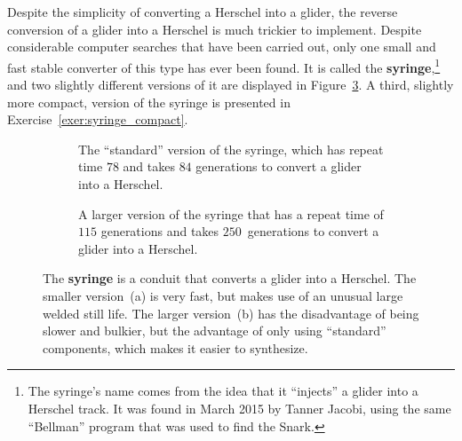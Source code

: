 Despite the simplicity of converting a Herschel into a glider, the reverse conversion of a glider into a Herschel is much trickier to implement. Despite considerable computer searches that have been carried out, only one small and fast stable converter of this type has ever been found. It is called the \textbf{syringe},\footnote{The syringe's name comes from the idea that it ``injects'' a glider into a Herschel track. It was found in March 2015 by Tanner Jacobi, using the same ``Bellman'' program that was used to find the Snark.} and two slightly different versions of it are displayed in Figure~\ref{fig:syringe}. A third, slightly more compact, version of the syringe is presented in Exercise~\ref{exer:syringe_compact}.

\begin{figure}[!htb]
	\centering
	\begin{subfigure}{.33\textwidth}
		\centering{}
		\caption{The ``standard'' version of the syringe, which has repeat time $78$ and takes $84$ generations to convert a glider into a Herschel.}\label{fig:syringe_main}
	\end{subfigure} \hfill %
	\begin{subfigure}{.635\textwidth}
		\centering{}
		\caption{A larger version of the syringe that has a repeat time of $115$ generations and takes $250$~generations to convert a glider into a Herschel.}
		\label{fig:syringe_modified}
	\end{subfigure}
	\caption{The \textbf{syringe} is a conduit that converts a glider into a Herschel. The smaller version~(a) is very fast, but makes use of an unusual large welded still life. The larger version~(b) has the disadvantage of being slower and bulkier, but the advantage of only using ``standard'' components, which makes it easier to synthesize.}\label{fig:syringe}
\end{figure}


